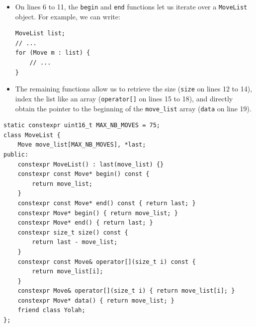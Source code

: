 \documentclass[12pt,a4paper,twoside,openright]{book}
\begin{document}
\begin{itemize}
\begin{verbatim}
                      last
                        |
                        v
    +-------+-------+-------+-------+     +-------+
    | a1:a2 | h8:g7 |       |       | ... |       |
    +-------+-------+-------+-------+     +-------+
       [0]     [1]     [2]     [3]           [74]
\end{verbatim}

\item On lines 6 to 11, the \texttt{begin} and \texttt{end} functions let us iterate over a \texttt{MoveList} object. For example, we can write:
\begin{verbatim}
MoveList list;
// ...
for (Move m : list) {
    // ...
}
\end{verbatim}

\item The remaining functions allow us to retrieve the size (\texttt{size} on lines 12 to 14), index the list like an array (\texttt{operator[]} on lines 15 to 18), and directly obtain the pointer to the beginning of the \texttt{move_list} array (\texttt{data} on line 19).

\end{itemize}

\begin{mdframed}[skipabove=\baselineskip,hidealllines=true]
\begin{verbatim}
static constexpr uint16_t MAX_NB_MOVES = 75;
class MoveList {
    Move move_list[MAX_NB_MOVES], *last;
public:
    constexpr MoveList() : last(move_list) {}
    constexpr const Move* begin() const { 
        return move_list; 
    }
    constexpr const Move* end() const { return last; }
    constexpr Move* begin() { return move_list; }
    constexpr Move* end() { return last; }
    constexpr size_t size() const { 
        return last - move_list; 
    }
    constexpr const Move& operator[](size_t i) const { 
        return move_list[i]; 
    }
    constexpr Move& operator[](size_t i) { return move_list[i]; }
    constexpr Move* data() { return move_list; }
    friend class Yolah;
};
\end{verbatim}
\label{lst:move_list_class}
\end{mdframed}
\end{document}
